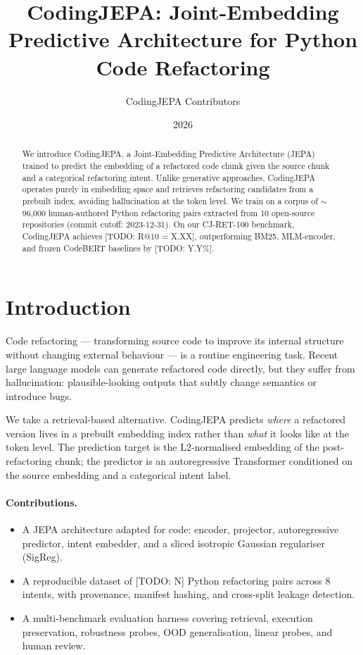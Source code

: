 \documentclass[10pt]{article}
\title{CodingJEPA: Joint-Embedding Predictive Architecture for Python Code Refactoring}
\author{CodingJEPA Contributors}
\date{2026}
\begin{document}
\maketitle

\begin{abstract}
We introduce CodingJEPA, a Joint-Embedding Predictive Architecture (JEPA) trained to predict
the embedding of a refactored code chunk given the source chunk and a categorical refactoring
intent. Unlike generative approaches, CodingJEPA operates purely in embedding space and
retrieves refactoring candidates from a prebuilt index, avoiding hallucination at the token
level. We train on a corpus of \(\sim\)96,000 human-authored Python refactoring pairs extracted
from 10 open-source repositories (commit cutoff: 2023-12-31). On our CJ-RET-100 benchmark,
CodingJEPA achieves [TODO: R@10 = X.XX], outperforming BM25, MLM-encoder, and frozen
CodeBERT baselines by [TODO: Y.Y\%].
\end{abstract}

\section{Introduction}
\label{sec:intro}

Code refactoring --- transforming source code to improve its internal structure without changing
external behaviour --- is a routine engineering task. Recent large language models can generate
refactored code directly, but they suffer from hallucination: plausible-looking outputs that
subtly change semantics or introduce bugs.

We take a retrieval-based alternative. CodingJEPA predicts \emph{where} a refactored version
lives in a prebuilt embedding index rather than \emph{what} it looks like at the token level.
The prediction target is the L2-normalised embedding of the post-refactoring chunk; the
predictor is an autoregressive Transformer conditioned on the source embedding and a categorical
intent label.

\paragraph{Contributions.}
\begin{itemize}
  \item A JEPA architecture adapted for code: encoder, projector, autoregressive predictor,
        intent embedder, and a sliced isotropic Gaussian regulariser (SigReg).
  \item A reproducible dataset of [TODO: N] Python refactoring pairs across 8 intents, with
        provenance, manifest hashing, and cross-split leakage detection.
  \item A multi-benchmark evaluation harness covering retrieval, execution preservation,
        robustness probes, OOD generalisation, linear probes, and human review.
\end{itemize}
\end{document}
